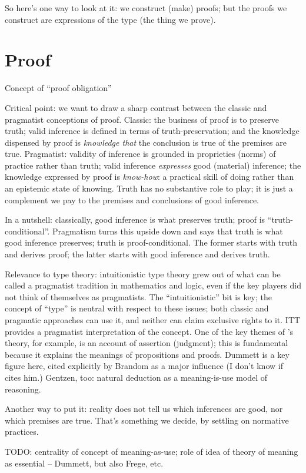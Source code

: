So here's one way to look at it: we construct (make) proofs; but the
proofs we construct are expressions of the type (the thing we prove).

\section{Proof}
\label{subs:proof}

\begin{ednote}
  Concept of ``proof obligation''
\end{ednote}

\begin{ednote}
  Critical point: we want to draw a sharp contrast between the classic
  and pragmatist conceptions of proof.  Classic: the business of proof
  is to preserve truth; valid inference is defined in terms of
  truth-preservation; and the knowledge dispensed by proof is
  \emph{knowledge that} the conclusion is true of the premises are
  true.  Pragmatist: validity of inference is grounded in proprieties
  (norms) of practice rather than truth; valid inference
  \emph{expresses} good (material) inference; the knowledge expressed
  by proof is \emph{know-how}: a practical skill of doing rather than
  an epistemic state of knowing.  Truth has no substantive role to
  play; it is just a complement we pay to the premises and conclusions
  of good inference.

  In a nutshell: classically, good inference is what preserves truth;
  proof is ``truth-conditional''.  Pragmatism turns this upside down
  and says that truth is what good inference preserves; truth is
  proof-conditional.  The former starts with truth and derives proof;
  the latter starts with good inference and derives truth.

  Relevance to type theory: intuitionistic type theory grew out of
  what can be called a pragmatist tradition in mathematics and logic,
  even if the key players did not think of themselves as pragmatists.
  The ``intuitionistic'' bit is key; the concept of ``type'' is
  neutral with respect to these issues; both classic and pragmatic
  approaches can use it, and neither can claim exclusive rights to it.
  ITT provides a pragmatist interpretation of the concept.  One of the
  key themes of \ML{}'s theory, for example, is an account of
  assertion (judgment); this is fundamental because it explains the
  meanings of propositions and proofs.  Dummett is a key figure here,
  cited explicitly by Brandom as a major influence (I don't know if
  \ML{} cites him.)  Gentzen, too: natural deduction as a
  meaning-is-use model of reasoning.

  Another way to put it: reality does not tell us which inferences are
  good, nor which premises are true.  That's something we decide, by
  settling on normative practices.

  TODO: centrality of concept of meaning-as-use; role of idea of
  theory of meaning as essential -- Dummett, but also Frege, etc.

\end{ednote}

